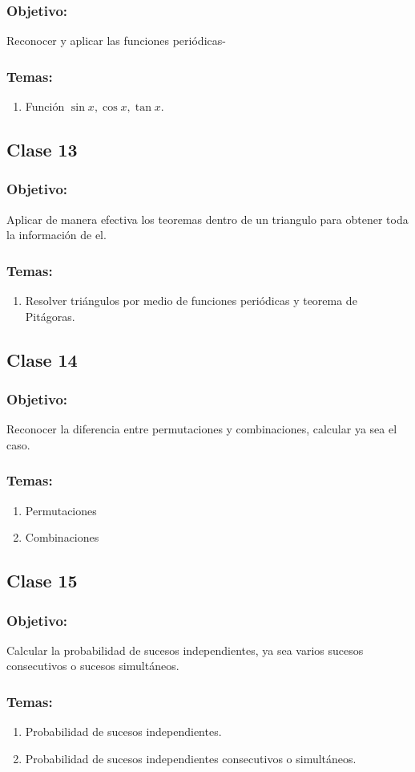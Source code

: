 \documentclass[12pt,letterpaper]{report}
\begin{document}
\subsubsection*{Objetivo:}
Reconocer y aplicar las funciones periódicas-
\subsubsection*{Temas:}
\begin{enumerate}
    \item Función $\sin{x}, \cos{x}, \tan{x}$.
\end{enumerate}
\subsection*{Clase 13}
\subsubsection*{Objetivo:}
Aplicar de manera efectiva los teoremas dentro de un triangulo para obtener toda la información de el.
\subsubsection*{Temas:}
\begin{enumerate}
\item Resolver triángulos por medio de funciones periódicas y teorema de Pitágoras.
\end{enumerate}
\subsection*{Clase 14}
\subsubsection*{Objetivo:}
Reconocer la diferencia entre permutaciones y combinaciones, calcular ya sea el caso.
\subsubsection*{Temas:}
\begin{enumerate}
    \item Permutaciones
    \item Combinaciones
\end{enumerate}
\subsection*{Clase 15}
\subsubsection*{Objetivo:}
Calcular la probabilidad de sucesos independientes, ya sea varios sucesos consecutivos o sucesos simultáneos.
\subsubsection*{Temas:}
\begin{enumerate}
    \item Probabilidad de sucesos independientes.
    \item Probabilidad de sucesos independientes consecutivos o simultáneos.
\end{enumerate}
\end{document}
